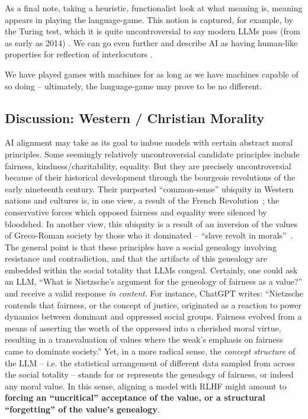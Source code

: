 As a final note, taking a heuristic, functionalist look at what meaning is, meaning appears in playing the language-game. This notion is captured, for example, by the Turing test, which it is quite uncontroversial to say modern LLMs pass (from as early as 2014) \citep{Warwick:MachinesThink}. We can go even further and describe AI as having human-like properties for reflection of interlocutors \citep{Sejnowski:ReverseTuringTest}.

We have played games with machines for as long as we have machines capable of so doing -- ultimately, the language-game may prove to be no different.

\subsection{Discussion: Western / Christian Morality}
\label{appendix:westernmorality}
AI alignment may take as its goal to imbue models with certain abstract moral principles.
Some seemingly relatively uncontroversial candidate principles include fairness, kindness/charitability, equality.
But they are precisely uncontroversial because of their historical development through the bourgeois revolutions of the early nineteenth century.
Their purported ``common-sense'' ubiquity in Western nations and cultures is, in one view, a result of the French Revolution~\citep{Scheler:Ressentiment}; the conservative forces which opposed fairness and equality were silenced by bloodshed. 
In another view, this ubiquity is a result of an inversion of the values of Greco-Roman society by those who it dominated -- ``slave revolt in morals''~\citep{Nietzsche:GenealogyMorals}.
The general point is that these principles have a social genealogy involving resistance and contradiction, and that the artifacts of this genealogy are embedded within the social totality that LLMs congeal.
Certainly, one could ask an LLM, ``What is Nietzsche's argument for the geneology of fairness as a value?'' and receive a valid response \textit{in content}. 
For instance, ChatGPT writes:
``Nietzsche contends that fairness, or the concept of justice, originated as a reaction to power dynamics between dominant and oppressed social groups. Fairness evolved from a means of asserting the worth of the oppressed into a cherished moral virtue, resulting in a transvaluation of values where the weak's emphasis on fairness came to dominate society.''
Yet, in a more radical sense, the \textit{concept structure} of the LLM -- i.e. the statistical arrangement of different data sampled from across the social totality -- stands for or represents the genealogy of fairness, or indeed any moral value.
In this sense, aligning a model with RLHF might amount to \textbf{forcing an ``uncritical'' acceptance of the value, or a structural ``forgetting'' of the value's genealogy}.

